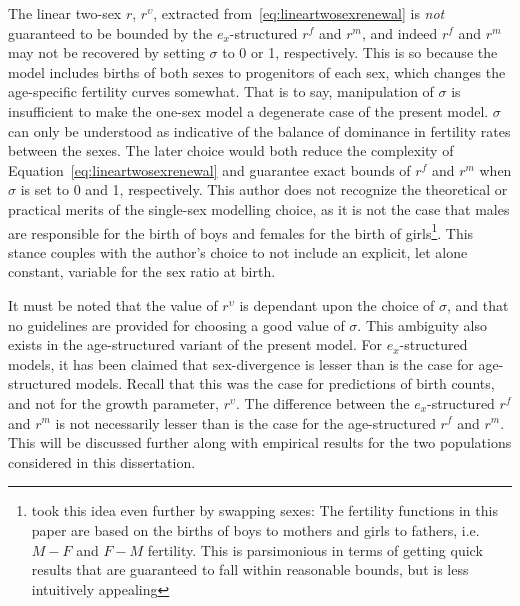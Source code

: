 The linear two-sex $r$, $r^\upsilon$, extracted from~\eqref{eq:lineartwosexrenewal} 
is \textit{not} guaranteed to be bounded by the $e_x$-structured $r^f$ and $r^m$,
and indeed $r^f$ and $r^m$ may not be recovered by setting $\sigma$ to 0 or 1,
respectively. This is so because the model includes births of both sexes to
progenitors of each sex, which changes the age-specific fertility curves
somewhat. That is to say, manipulation of $\sigma$ is insufficient to make the
one-sex model a degenerate case of the present model. $\sigma$ can only be
understood as indicative of the balance of dominance in fertility rates between
the sexes. The later choice would both reduce the complexity of
Equation~\ref{eq:lineartwosexrenewal} and guarantee exact bounds of $r^f$ and $r^m$ 
when $\sigma$ is set to 0 and 1, respectively. This author does not recognize 
the theoretical or practical merits of the single-sex modelling choice, as it 
is not the case that males are responsible for the birth of boys and females 
for the birth of girls\footnote{\citet{pollard1948measurement} took this idea
even further by swapping sexes: The fertility functions in this paper are based on the births of boys to mothers and girls to fathers, i.e. $M-F$ and $F-M$ fertility. This is parsimonious 
in terms of getting quick results that are guaranteed to fall within reasonable bounds, but is less
intuitively appealing}. This stance couples with the author's choice to not
include an explicit, let alone constant, variable for the sex ratio at birth.

It must be
noted that the value of $r^\upsilon$ is dependant upon the choice of $\sigma$, 
and that no guidelines are provided for choosing a good value of $\sigma$. 
This ambiguity also exists in the age-structured variant of the present model. 
For $e_x$-structured models, it has been claimed that sex-divergence is lesser than is the case for
age-structured models. Recall that this was the case for predictions of birth
counts, and not for the growth parameter, $r^\upsilon$. The
difference between the $e_x$-structured $r^f$ and $r^m$ is not necessarily lesser than is the case for
the age-structured $r^f$ and $r^m$. This will be discussed further along with
empirical results for the two populations considered in this dissertation.

